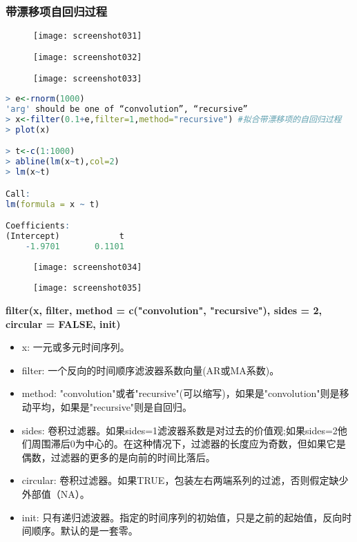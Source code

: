 \documentclass[11pt,a4paper,oneside]{book}
\begin{document}
\subsubsection{带漂移项自回归过程}
\begin{figure}[H]
	\texttt{[image: screenshot031]}
	\label{fig:screenshot031}
\end{figure}
\begin{figure}[H]
	\texttt{[image: screenshot032]}
	\label{fig:screenshot032}
\end{figure}
\begin{figure}[H]
	\texttt{[image: screenshot033]}
	\label{fig:screenshot033}
\end{figure}
\begin{lstlisting}[language=r]
> e<-rnorm(1000)
'arg' should be one of “convolution”, “recursive”
> x<-filter(0.1+e,filter=1,method="recursive") #拟合带漂移项的自回归过程
> plot(x)

> t<-c(1:1000)
> abline(lm(x~t),col=2)
> lm(x~t)

Call:
lm(formula = x ~ t)

Coefficients:
(Intercept)            t  
    -1.9701       0.1101  
\end{lstlisting}
\begin{figure}[H]
	\texttt{[image: screenshot034]}
	\label{fig:screenshot034}
\end{figure}
\begin{figure}[H]
	\texttt{[image: screenshot035]}
	\label{fig:screenshot035}
\end{figure}

\begin{tcolorbox}[colback=pink!10!white,colframe=pink!100!black]
	\textbf{filter(x, filter, method = c("convolution", "recursive"), sides = 2, circular = FALSE, init)}
	\begin{itemize}
		\item x: 一元或多元时间序列。
		\item filter: 一个反向的时间顺序滤波器系数向量(AR或MA系数)。
		\item method: "convolution"或者"recursive"(可以缩写)，如果是"convolution"则是移动平均，如果是"recursive"则是自回归。
		\item sides: 卷积过滤器。如果sides=1滤波器系数是对过去的价值观;如果sides=2他们周围滞后0为中心的。在这种情况下，过滤器的长度应为奇数，但如果它是偶数，过滤器的更多的是向前的时间比落后。
		\item circular: 卷积过滤器。如果TRUE，包装左右两端系列的过滤，否则假定缺少外部值（NA）。
		\item init: 只有递归滤波器。指定的时间序列的初始值，只是之前的起始值，反向时间顺序。默认的是一套零。
	\end{itemize}
\end{tcolorbox}
\end{document}
